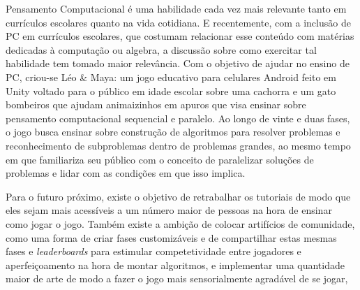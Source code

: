 \documentclass[conference]{IEEEtran}
\begin{document}
Pensamento Computacional é uma habilidade cada vez mais relevante tanto em currículos escolares quanto na vida cotidiana. E recentemente, com a inclusão de PC em currículos escolares, que costumam relacionar esse conteúdo com matérias dedicadas à computação ou algebra, a discussão sobre como exercitar tal habilidade tem tomado maior relevância. Com o objetivo de ajudar no ensino de PC, criou-se Léo \& Maya: um jogo educativo para celulares Android feito em Unity voltado para o público em idade escolar sobre uma cachorra e um gato bombeiros que ajudam animaizinhos em apuros que visa ensinar sobre pensamento computacional sequencial e paralelo. Ao longo de vinte e duas fases, o jogo busca ensinar sobre construção de algoritmos para resolver problemas e reconhecimento de subproblemas dentro de problemas grandes, ao mesmo tempo em que familiariza seu público com o conceito de paralelizar soluções de problemas e lidar com as condições em que isso implica. 

Para o futuro próximo, existe o objetivo de retrabalhar os tutoriais de modo que eles sejam mais acessíveis a um número maior de pessoas na hora de ensinar como jogar o jogo. Também existe a ambição de colocar artifícios de comunidade, como uma forma de criar fases customizáveis e de compartilhar estas mesmas fases e \textit{leaderboards} para estimular competetividade entre jogadores e aperfeiçoamento na hora de montar algoritmos, e implementar uma quantidade maior de arte de modo a fazer o jogo mais sensorialmente agradável de se jogar,


%
\end{document}
